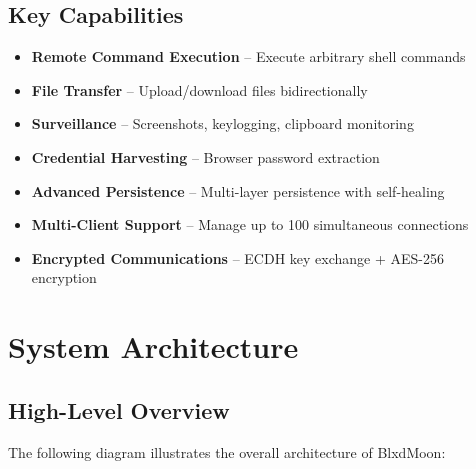 \documentclass[12pt,a4paper]{article}
\begin{document}
\subsection{Key Capabilities}

\begin{itemize}[leftmargin=*]
    \item \textbf{Remote Command Execution} -- Execute arbitrary shell commands
    \item \textbf{File Transfer} -- Upload/download files bidirectionally
    \item \textbf{Surveillance} -- Screenshots, keylogging, clipboard monitoring
    \item \textbf{Credential Harvesting} -- Browser password extraction
    \item \textbf{Advanced Persistence} -- Multi-layer persistence with self-healing
    \item \textbf{Multi-Client Support} -- Manage up to 100 simultaneous connections
    \item \textbf{Encrypted Communications} -- ECDH key exchange + AES-256 encryption
\end{itemize}

\newpage
\section{System Architecture}

\subsection{High-Level Overview}

The following diagram illustrates the overall architecture of BlxdMoon:
\end{document}
